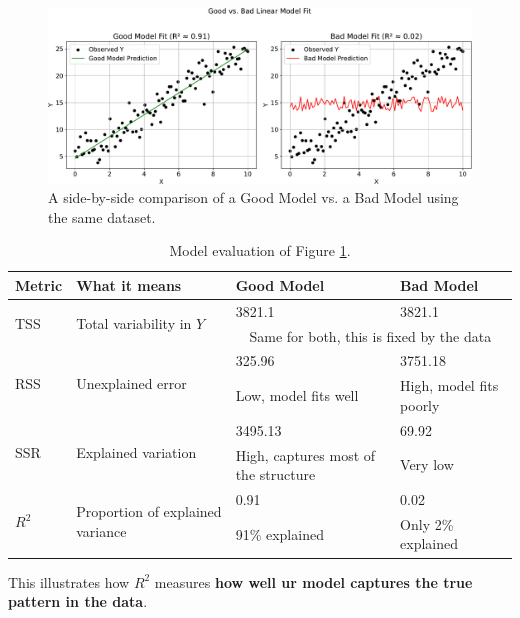 \begin{figure}[!htp]
    \centering
    \includegraphics[width=\textwidth]{img/linear-regression/model-evaluation.pdf}
    \caption{A side-by-side comparison of a Good Model vs. a Bad Model using the same dataset.}
    \label{fig: good vs bad model}
\end{figure}

\newpage

\begin{table}[!htp]
    \centering
    \begin{adjustbox}{width={\textwidth},totalheight={\textheight},keepaspectratio}
    \begin{tabular}{@{} l l p{10em} l @{}}
        \toprule
        \textbf{Metric} & \textbf{What it means} & \textbf{Good Model} & \textbf{Bad Model} \\
        \midrule
        \multirow{2}{*}{TSS}        & \multirow{2}{*}{Total variability in $Y$} & 3821.1 & 3821.1 \\ [.3em]
                                    &  & \multicolumn{2}{c}{Same for both, this is fixed by the data} \\
        \cmidrule{1-4}
        \multirow{2}{*}{RSS}        & \multirow{2}{*}{Unexplained error} & 325.96 & 3751.18 \\ [.3em]
                                    &  & Low, model fits well & High, model fits poorly \\
        \cmidrule{1-4}
        \multirow{2}{*}{SSR}        & \multirow{2}{*}{Explained variation} & 3495.13 & 69.92 \\ [.3em]
                                    &  & High, captures most of the structure & Very low \\
        \cmidrule{1-4}
        \multirow{2}{*}{$R^{2}$}    & \multirow{2}{*}{Proportion of explained variance} & 0.91 & 0.02 \\ [.3em]
                                    &  & 91\% explained & Only 2\% explained \\
        \bottomrule
    \end{tabular}
    \end{adjustbox}
    \caption{Model evaluation of Figure \ref{fig: good vs bad model}.}
\end{table}

\noindent
This illustrates how $R^{2}$ measures \textbf{how well ur model captures the true pattern in the data}.